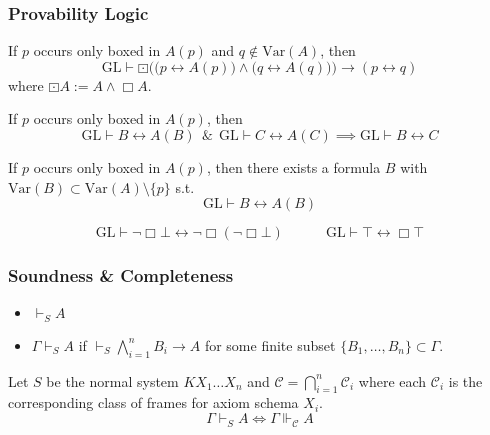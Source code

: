 \documentclass[UTF8,aspectratio=43,11pt,colorlinks,compress,openany]{beamer}%
\begin{document}
\begin{frame}\frametitle{Provability Logic}
\setlength\abovedisplayskip{0pt}
\setlength\belowdisplayskip{0pt}\vspace{-1ex}
	\begin{theorem}
		If $p$ occurs only boxed in $A(p)$ and $q\notin \mathrm{Var}(A)$, then
		\[\mathrm{GL}\vdash\boxdot\Big(\big(p\leftrightarrow A(p)\big)\wedge\big(q\leftrightarrow A(q)\big)\Big)\to(p\leftrightarrow q)\]
		where $\boxdot A:= A\wedge\Box A$.
	\end{theorem}\vspace{-1ex}
	\begin{corollary}
		If $p$ occurs only boxed in $A(p)$, then \[\mathrm{GL}\vdash B\leftrightarrow A(B)\;\,\&\;\,\mathrm{GL}\vdash C\leftrightarrow A(C)\implies\mathrm{GL}\vdash B\leftrightarrow C\]
	\end{corollary}\vspace{-1ex}
	\begin{theorem}
		If $p$ occurs only boxed in $A(p)$, then there exists a formula $B$ with $\mathrm{Var}(B)\subset \mathrm{Var}(A)\setminus\{p\}$ s.t.
		\[\mathrm{GL}\vdash B\leftrightarrow A(B)\]	
	\end{theorem}
	\begin{center}
	\end{center}
	\[\mathrm{GL}\vdash\neg\Box\bot\leftrightarrow\neg\Box(\neg\Box\bot)\qquad\quad\mathrm{GL}\vdash\top\leftrightarrow\Box\top\]
\end{frame}

\begin{frame}\frametitle{Soundness \& Completeness}
	\begin{definition}
		\begin{itemize}
			\item $\vdash_S A$
			\item $\Gamma\vdash_S A$ if $\vdash_S\bigwedge\limits_{i=1}^n B_i\to A$ for some finite subset $\{B_1,\dots, B_n\}\subset\Gamma$.
		\end{itemize}
	\end{definition}
	\begin{theorem}
		Let $S$ be the normal system $KX_1\dots X_n$ and $\mathcal{C}=\bigcap\limits_{i=1}^n\mathcal{C}_i$ where each $\mathcal{C}_i$ is the corresponding class of frames for axiom schema $X_i$.
		\[\Gamma\vdash_S A\iff\Gamma\Vdash_{\mathcal{C}} A\]
	\end{theorem}
\end{frame}
\end{document}
